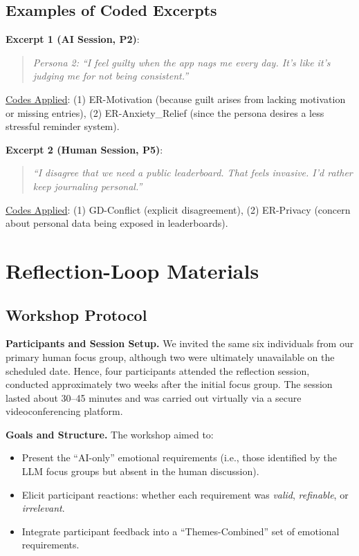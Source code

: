 \documentclass[acmsmall]{acmart}
\begin{document}
\subsection{Examples of Coded Excerpts}

\noindent\textbf{Excerpt 1 (AI Session, P2)}:
\begin{quote}
\emph{Persona 2: “I feel guilty when the app nags me every day. It’s like it’s judging me for not being consistent.”}
\end{quote}
\underline{Codes Applied}: 
(1) ER-Motivation (because guilt arises from lacking motivation or missing entries), 
(2) ER-Anxiety\_Relief (since the persona desires a less stressful reminder system).

\noindent\textbf{Excerpt 2 (Human Session, P5)}:
\begin{quote}
\emph{“I disagree that we need a public leaderboard. That feels invasive. I’d rather keep journaling personal.”}
\end{quote}
\underline{Codes Applied}: 
(1) GD-Conflict (explicit disagreement), 
(2) ER-Privacy (concern about personal data being exposed in leaderboards).
\section{Reflection-Loop Materials}
\label{sec:reflection_loop_materials}

\subsection{Workshop Protocol}

\textbf{Participants and Session Setup.} We invited the same six individuals from our primary human focus group, although two were ultimately unavailable on the scheduled date. Hence, four participants attended the reflection session, conducted approximately two weeks after the initial focus group. The session lasted about 30--45 minutes and was carried out virtually via a secure videoconferencing platform.

\textbf{Goals and Structure.} The workshop aimed to:
\begin{itemize}
    \item Present the “AI-only” emotional requirements (i.e., those identified by the LLM focus groups but absent in the human discussion).
    \item Elicit participant reactions: whether each requirement was \emph{valid}, \emph{refinable}, or \emph{irrelevant}.
    \item Integrate participant feedback into a “Themes-Combined” set of emotional requirements.
\end{itemize}
\end{document}
